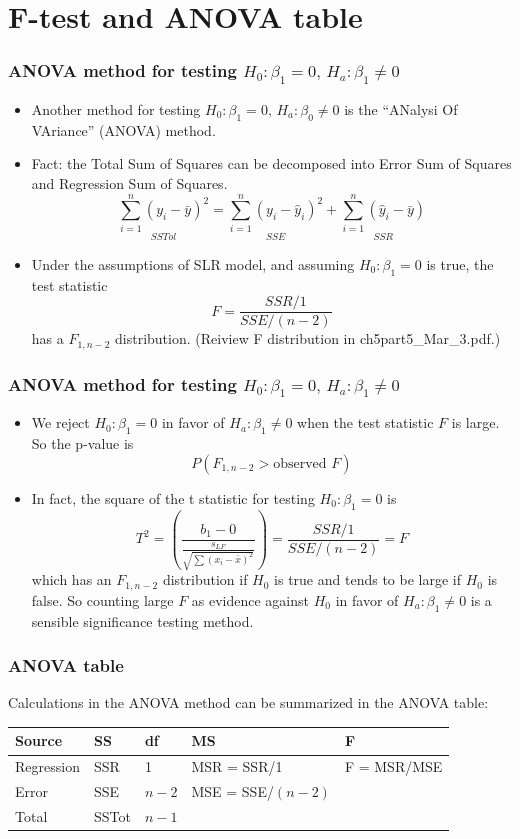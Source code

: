 \documentclass[handout]{beamer}\usepackage[]{graphicx}\usepackage[]{color}
\numberwithin{equation}{section}
\begin{document}
\section{F-test and ANOVA table}
\begin{frame}
\frametitle{ANOVA method for testing $H_0: \beta_1 = 0,\, H_a: \beta_1 \neq 0$}
\begin{itemize}
\item Another method for testing $H_0: \beta_1 = 0,\, H_a: \beta_0 \neq 0$ is the ``ANalysi Of VAriance'' (ANOVA) method.
\item Fact: the Total Sum of Squares can be decomposed into Error Sum of Squares and Regression Sum of Squares. 
\[\underset{SSTol}{\sum_{i=1}^n(y_i - \bar{y})^2} = \underset{SSE}{\sum_{i=1}^n (y_i - \hat{y}_i)^2} + \underset{SSR}{\sum_{i=1}^n (\hat{y}_i - \bar{y})}\]

\item Under the assumptions of SLR model, and assuming $H_0: \beta_1 = 0$ is true, the test statistic
\[F = \frac{SSR/1}{SSE/(n-2)}\]
has a $F_{1, n-2}$ distribution. (Reiview F distribution in {\color{blue} ch5part5\_Mar\_3.pdf}.)
\end{itemize}
\end{frame}

\begin{frame}
\frametitle{ANOVA method for testing $H_0: \beta_1 = 0,\, H_a: \beta_1 \neq 0$}
\begin{itemize}
\item We reject $H_0: \beta_1 = 0$ in favor of $H_a: \beta_1 \neq 0$ when the test statistic $F$ is large. So the p-value is
\[P(F_{1, n-2} > \mbox{observed $F$})\]

\item
In fact, the square of the t statistic for testing $H_0 : \beta_1 = 0$ is
\[T^2 = \left(\frac{b_1 - 0}{\frac{s_{LF}}{\sqrt{\sum (x_i - \bar{x})^2}}}\right) = \frac{SSR/1}{SSE/(n-2)} = F\]
which has an $F_{1, n-2}$ distribution if $H_0$ is true and tends to be large if $H_0$ is false. So counting large $F$ as evidence against $H_0$ in favor of $H_a: \beta_1 \neq 0$ is a sensible significance testing method.
\end{itemize}
\end{frame}

\begin{frame}
\frametitle{ANOVA table}
Calculations in the ANOVA method can be summarized in the ANOVA table:

\vspace{2em}

\scriptsize
\begin{tabular}{lllll}
Source & SS & df & MS & F\\ \hline
Regression & SSR & 1 & MSR = SSR/1 & F = MSR/MSE\\
Error & SSE & $n-2$ & MSE = SSE/$(n-2)$ & \\ \hline
Total & SSTot & $n-1$ & &
\end{tabular}
\end{frame}
\end{document}
